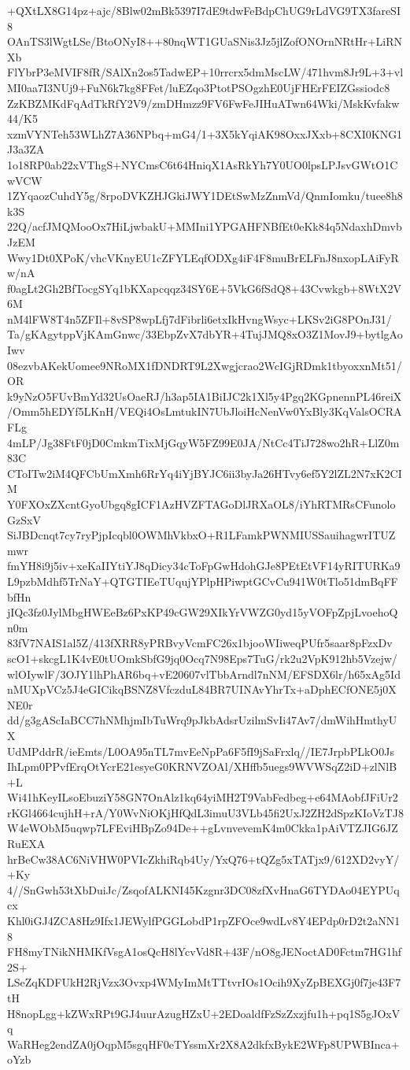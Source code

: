 +QXtLX8G14pz+ajc/8Blw02mBk5397I7dE9tdwFeBdpChUG9rLdVG9TX3fareSI8
OAnTS3lWgtLSe/BtoONyI8++80nqWT1GUaSNis3Jz5jlZofONOrnNRtHr+LiRNXb
FlYbrP3eMVIF8fR/SAlXn2os5TadwEP+10rrcrx5dmMscLW/471hvm8Jr9L+3+vl
MI0aa7I3NUj9+FuN6k7kg8FFet/luEZqo3PtotPSOgzhE0UjFHErFEIZGssiodc8
ZzKBZMKdFqAdTkRfY2V9/zmDHmzz9FV6FwFeJIHuATwn64Wki/MskKvfakw44/K5
xzmVYNTeh53WLhZ7A36NPbq+mG4/1+3X5kYqiAK98OxxJXxb+8CXI0KNG1J3a3ZA
1o18RP0ab22xVThgS+NYCmsC6t64HniqX1AsRkYh7Y0UO0lpsLPJsvGWtO1CwVCW
1ZYqaozCuhdY5g/8rpoDVKZHJGkiJWY1DEtSwMzZnmVd/QnmIomku/tuee8h8k3S
22Q/acfJMQMooOx7HiLjwbakU+MMIni1YPGAHFNBfEt0eKk84q5NdaxhDmvbJzEM
Wwy1Dt0XPoK/vhcVKnyEU1cZFYLEqfODXg4iF4F8muBrELFnJ8nxopLAiFyRw/nA
f0agLt2Gh2BfTocgSYq1bKXapcqqz34SY6E+5VkG6fSdQ8+43Cvwkgb+8WtX2V6M
nM4lFW8T4n5ZFIl+8vSP8wpLfj7dFibrli6etxIkHvngWsyc+LKSv2iG8POnJ31/
Ta/gKAgytppVjKAmGnwc/33EbpZvX7dbYR+4TujJMQ8xO3Z1MovJ9+bytlgAoIwv
08ezvbAKekUomee9NRoMX1fDNDRT9L2Xwgjcrao2WcIGjRDmk1tbyoxxnMt51/OR
k9yNzO5FUvBmYd32UsOaeRJ/h3ap5IA1BiIJC2k1Xl5y4Pgq2KGpnennPL46reiX
/Omm5hEDYf5LKnH/VEQi4OsLmtukIN7UbJloiHcNenVw0YxBly3KqValsOCRAFLg
4mLP/Jg38FtF0jD0CmkmTixMjGqyW5FZ99E0JA/NtCc4TiJ728wo2hR+LlZ0m83C
CToITw2iM4QFCbUmXmh6RrYq4iYjBYJC6ii3byJa26HTvy6ef5Y2lZL2N7xK2CIM
Y0FXOxZXcntGyoUbgq8gICF1AzHVZFTAGoDlJRXaOL8/iYhRTMRsCFunoloGzSxV
SiJBDcnqt7cy7ryPjpIcqbl0OWMhVkbxO+R1LFamkPWNMIUSSauihagwrITUZmwr
fmYH8i9j5iv+xeKaIIYtiYJ8qDicy34cToFpGwHdohGJe8PEtEtVF14yRITURKa9
L9pzbMdhf5TrNaY+QTGTIEeTUqujYPlpHPiwptGCvCu941W0tTlo51dmBqFFbfHn
jIQc3fz0JylMbgHWEeBz6PxKP49cGW29XIkYrVWZG0yd15yVOFpZpjLvoehoQn0m
83fV7NAIS1al5Z/413fXRR8yPRBvyVcmFC26x1bjooWIiweqPUfr5saar8pFzxDv
scO1+skcgL1K4vE0tUOmkSbfG9jq0Ocq7N98Eps7TuG/rk2u2VpK912hb5Vzejw/
wlOIywlF/3OJY1lhPhAR6bq+vE20607vlTbbArndl7nNM/EFSDX6lr/h65xAg5Id
nMUXpVCz5J4eGICikqBSNZ8VfczduL84BR7UINAvYhrTx+aDphECfONE5j0XNE0r
dd/g3gAScIaBCC7hNMhjmIbTuWrq9pJkbAdsrUzilmSvIi47Av7/dmWihHmthyUX
UdMPddrR/ieEmts/L0OA95nTL7mvEeNpPa6F5fI9jSaFrxlq//IE7JrpbPLkO0Js
IhLpm0PPvfErqOtYcrE21esyeG0KRNVZOAl/XHffb5uegs9WVWSqZ2iD+zlNlB+L
Wi41hKeyILsoEbuziY58GN7OnAlz1kq64yiMH2T9VabFedbeg+e64MAobfJFiUr2
rKGl4664cujhH+rA/Y0WvNiOKjHfQdL3imuU3VLb45fi2UxJ2ZH2dSpzKIoVzTJ8
W4eWObM5uqwp7LFEviHBpZo94De++gLvnvevemK4m0Ckka1pAiVTZJIG6JZRuEXA
hrBeCw38AC6NiVHW0PVIcZkhiRqb4Uy/YxQ76+tQZg5xTATjx9/612XD2vyY/+Ky
4//SnGwh53tXbDuiJc/ZsqofALKNI45Kzgnr3DC08zfXvHnaG6TYDAo04EYPUqcx
Khl0iGJ4ZCA8Hz9Ifx1JEWylfPGGLobdP1rpZFOce9wdLv8Y4EPdp0rD2t2aNN18
FH8myTNikNHMKfVsgA1osQcH8lYcvVd8R+43F/nO8gJENoctAD0Fctm7HG1hf2S+
LSeZqKDFUkH2RjVzx3Ovxp4WMyImMtTTtvrIOs1Ocih9XyZpBEXGj0f7je43F7tH
H8nopLgg+kZWxRPt9GJ4uurAzugHZxU+2EDoaldfFzSzZxzjfu1h+pq1S5gJOxVq
WaRHeg2endZA0jOqpM5sgqHF0eTYssmXr2X8A2dkfxBykE2WFp8UPWBInca+oYzb
